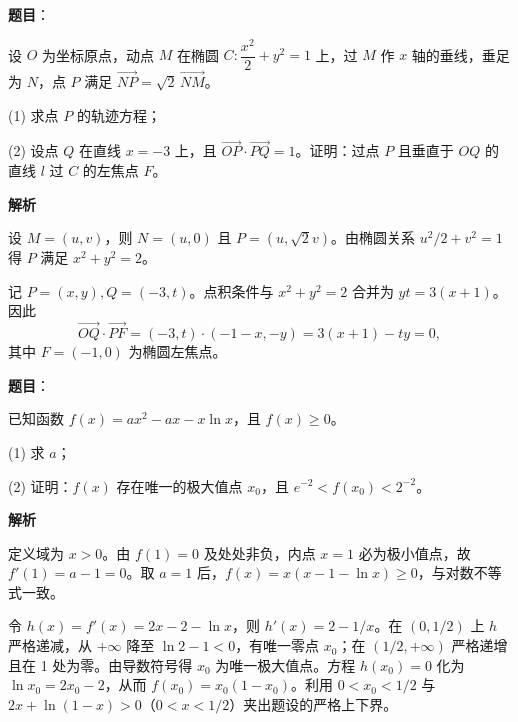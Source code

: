 \begin{answer}

\textbf{题目}：

设 \(O\) 为坐标原点，动点 \(M\) 在椭圆 \(C:\dfrac{x^2}{2}+y^2=1\) 上，过 \(M\) 作 \(x\) 轴的垂线，垂足为 \(N\)，点 \(P\) 满足 \(\overrightarrow{NP}=\sqrt{2}\,\overrightarrow{NM}\)。

   (1) 求点 \(P\) 的轨迹方程；

   (2) 设点 \(Q\) 在直线 \(x=-3\) 上，且 \(\overrightarrow{OP}\cdot\overrightarrow{PQ}=1\)。证明：过点 \(P\) 且垂直于 \(OQ\) 的直线 \(l\) 过 \(C\) 的左焦点 \(F\)。

\textbf{解析}


设 \(M=(u,v)\)，则 \(N=(u,0)\) 且 \(P=(u,\sqrt2v)\)。由椭圆关系 \(u^2/2+v^2=1\) 得 \(P\) 满足 \(x^2+y^2=2\)。


记 \(P=(x,y),Q=(-3,t)\)。点积条件与 \(x^2+y^2=2\) 合并为 \(yt=3(x+1)\)。因此
\nopagebreak[4]
\[
\overrightarrow{OQ}\cdot\overrightarrow{PF}=(-3,t)\cdot(-1-x,-y)=3(x+1)-ty=0,
\]
其中 \(F=(-1,0)\) 为椭圆左焦点。



\end{answer}
\begin{answer}

\textbf{题目}：

已知函数 \(f(x)=ax^2-ax-x\ln x\)，且 \(f(x)\geq 0\)。

   (1) 求 \(a\)；

   (2) 证明：\(f(x)\) 存在唯一的极大值点 \(x_0\)，且 \(e^{-2}<f(x_0)<2^{-2}\)。

\textbf{解析}


定义域为 \(x>0\)。由 \(f(1)=0\) 及处处非负，内点 \(x=1\) 必为极小值点，故 \(f'(1)=a-1=0\)。取 \(a=1\) 后，\(f(x)=x(x-1-\ln x)\ge0\)，与对数不等式一致。


令 \(h(x)=f'(x)=2x-2-\ln x\)，则 \(h'(x)=2-1/x\)。在 \((0,1/2)\) 上 \(h\) 严格递减，从 \(+\infty\) 降至 \(\ln2-1<0\)，有唯一零点 \(x_0\)；在 \((1/2,+\infty)\) 严格递增且在 1 处为零。由导数符号得 \(x_0\) 为唯一极大值点。方程 \(h(x_0)=0\) 化为 \(\ln x_0=2x_0-2\)，从而 \(f(x_0)=x_0(1-x_0)\)。利用 \(0<x_0<1/2\) 与 \(2x+\ln(1-x)>0\)（\(0<x<1/2\)）夹出题设的严格上下界。



\end{answer}
